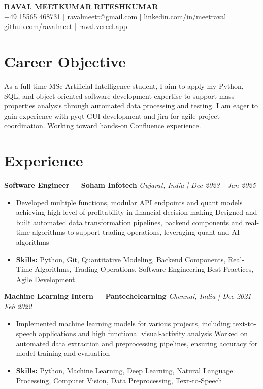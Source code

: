 \documentclass[a4paper,10pt]{article}
\begin{document}
\begin{center}
  {\Large\bfseries RAVAL MEETKUMAR RITESHKUMAR}\\[2pt]
  {\small +49 15565 468731 \;|\; \href{mailto:ravalmeett@gmail.com}{ravalmeett@gmail.com} \;|\; \href{https://www.linkedin.com/in/meetraval/}{linkedin.com/in/meetraval} \;|\; \href{https://github.com/ravalmeet}{github.com/ravalmeet} \;|\; \href{https://raval.vercel.app/}{raval.vercel.app}}
\end{center}
\vspace{-3pt}

\section*{Career Objective}
As a full-time MSc Artificial Intelligence student, I aim to apply my Python, SQL, and object-oriented software development expertise to support mass-properties analysis through automated data processing and testing. I am eager to gain experience with pyqt GUI development and jira for agile project coordination. Working toward hands-on Confluence experience.\par

\section*{Experience}
\textbf{Software Engineer} — \textbf{Soham Infotech} \hfill \textit{Gujarat, India \;|\; Dec 2023 - Jan 2025}\par
\vspace{1pt}
\begin{itemize}
  \item Developed multiple functions, modular API endpoints and quant models achieving high level of profitability in financial decision-making Designed and built automated data transformation pipelines, backend components and real-time algorithms to support trading operations, leveraging quant and AI algorithms
  \item \textbf{Skills:} Python, Git, Quantitative Modeling, Backend Components, Real-Time Algorithms, Trading Operations, Software Engineering Best Practices, Agile Development
\end{itemize}
\vspace{3pt}
\textbf{Machine Learning Intern} — \textbf{Pantechelearning} \hfill \textit{Chennai, India \;|\; Dec 2021 - Feb 2022}\par
\vspace{1pt}
\begin{itemize}
  \item Implemented machine learning models for various projects, including text-to-speech applications and high functional visual-activity analysis Worked on automated data extraction and preprocessing pipelines, ensuring accuracy for model training and evaluation
  \item \textbf{Skills:} Python, Machine Learning, Deep Learning, Natural Language Processing, Computer Vision, Data Preprocessing, Text-to-Speech
\end{itemize}
\end{document}
